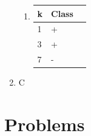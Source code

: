 \documentclass{report}
\begin{document}
\begin{enumerate}
\begin{enumerate}
    \item 
      \begin{center}
        \begin{tabular}{| l | l | l |}
          \hline
          k & Class \\ \hline
          1 & + \\
          3 & + \\
          7 & - \\
          \hline
        \end{tabular}
      \end{center}       	  
  	\end{enumerate}

  \item C
\end{enumerate}

\section*{Problems}
\end{document}
